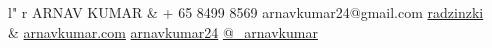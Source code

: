 \documentclass[11pt, letter]{article}
\begin{document}
%
\begin{adjustbox}{width=1.03\textwidth,center}
\begin{tabular}{ l" r }
  {
    {\titlefont\fontsize{35pt}{22pt}\selectfont
      ARNAV KUMAR
    }
  }
&
\faMobilePhone {} + 65 8499 8569 \textbullet{}
\faEnvelope {} arnavkumar24@gmail.com \textbullet{}
\faGithubSign{ }\href{https://github.com/radzinzki}{radzinzki}
\\
&
\faExternalLink{ }\href{http://arnavkumar.com.com}{arnavkumar.com} \textbullet{}
\faLinkedinSign{ }\href{http://sg.linkedin.com/in/arnavkumar24/}{arnavkumar24} \textbullet{}
\faTwitterSign{ }\href{http://twitter.com/\_arnavkumar}{@\_arnavkumar}
\\
\end{tabular}
\end{adjustbox}

\begin{raggedright}
\vspace{5mm}


\end{raggedright}
\end{document}
